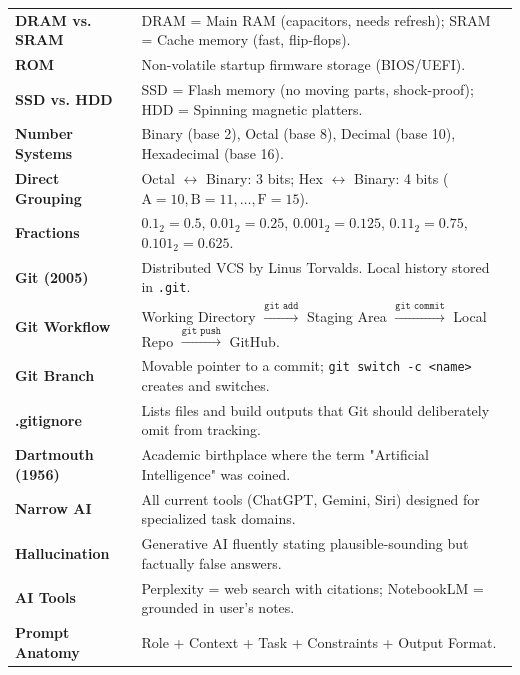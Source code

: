 \documentclass[a4paper,11pt]{article}
\begin{document}
\begin{tcolorbox}[enhanced, colback=NoteYellow, colframe=DeepNavy, boxrule=1.2pt, arc=3mm, title={\large\bfseries The Night-Before Exam Memory Matrix}, fonttitle=\sffamily\bfseries\color{white}, colbacktitle=DeepNavy]
\begin{tabularx}{\textwidth}{@{}l X@{}}
\textbf{DRAM vs. SRAM} & DRAM = Main RAM (capacitors, needs refresh); SRAM = Cache memory (fast, flip-flops). \\
\textbf{ROM} & Non-volatile startup firmware storage (BIOS/UEFI). \\
\textbf{SSD vs. HDD} & SSD = Flash memory (no moving parts, shock-proof); HDD = Spinning magnetic platters. \\
\midrule
\textbf{Number Systems} & Binary (base 2), Octal (base 8), Decimal (base 10), Hexadecimal (base 16). \\
\textbf{Direct Grouping} & Octal $\leftrightarrow$ Binary: 3 bits; Hex $\leftrightarrow$ Binary: 4 bits ($\text{A}=10, \text{B}=11, \dots, \text{F}=15$). \\
\textbf{Fractions} & $0.1_2 = 0.5$, $0.01_2 = 0.25$, $0.001_2 = 0.125$, $0.11_2 = 0.75$, $0.101_2 = 0.625$. \\
\midrule
\textbf{Git (2005)} & Distributed VCS by Linus Torvalds. Local history stored in \texttt{.git}. \\
\textbf{Git Workflow} & Working Directory $\xrightarrow{\texttt{git add}}$ Staging Area $\xrightarrow{\texttt{git commit}}$ Local Repo $\xrightarrow{\texttt{git push}}$ GitHub. \\
\textbf{Git Branch} & Movable pointer to a commit; \texttt{git switch -c <name>} creates and switches. \\
\textbf{.gitignore} & Lists files and build outputs that Git should deliberately omit from tracking. \\
\midrule
\textbf{Dartmouth (1956)} & Academic birthplace where the term "Artificial Intelligence" was coined. \\
\textbf{Narrow AI} & All current tools (ChatGPT, Gemini, Siri) designed for specialized task domains. \\
\textbf{Hallucination} & Generative AI fluently stating plausible-sounding but factually false answers. \\
\textbf{AI Tools} & Perplexity = web search with citations; NotebookLM = grounded in user's notes. \\
\textbf{Prompt Anatomy} & Role + Context + Task + Constraints + Output Format. \\
\bottomrule
\end{tabularx}
\end{tcolorbox}
\end{document}
